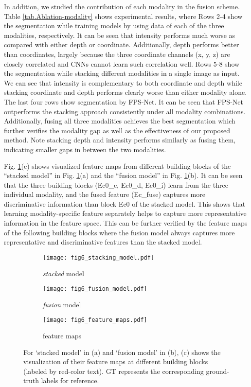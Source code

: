 \documentclass[preprint,review,3p]{elsarticle}
\begin{document}
In addition, we studied the contribution of each modality in the fusion scheme. Table \ref{tab.Ablation-modality} shows experimental results, where Rows 2-4 show the segmentation while training models by using data of each of the three modalities, respectively. It can be seen that intensity performs much worse as compared with either depth or coordinate.
Additionally, depth performs better than coordinates, largely because the three coordinate channels (x, y, z) are closely correlated and CNNs cannot learn such correlation well. 
Rows 5-8 show the segmentation while stacking different modalities in a single image as input. 
We can see that intensity is complementary to both coordinate and depth while stacking coordinate and depth performs clearly worse than either modality alone. 
The last four rows show segmentation by FPS-Net. It can be seen that FPS-Net outperforms the stacking approach consistently under all modality combinations.
Additionally, fusing all three modalities achieves the best segmentation which further verifies the modality gap as well as the effectiveness of our proposed method.
Note stacking depth and intensity performs similarly as fusing them, indicating smaller gaps in between the two modalities.


Fig. \ref{fig.features}(c) shows visualized feature maps from different building blocks of the ``stacked model” in Fig. \ref{fig.features}(a) and the ``fusion model” in Fig. \ref{fig.features}(b). It can be seen that the three building blocks (Ec0\_c, Ec0\_d, Ec0\_i) learn from the three individual modality, and the fused feature (Ec\_fuse) captures more discriminative information than block Ec0 of the stacked model. This shows that learning modality-specific feature separately helps to capture more representative information in the feature space. This can be further verified by the feature maps of the following building blocks where the fusion model always captures more representative and discriminative features than the stacked model.

\begin{figure}
  \begin{subfigure}[b]{0.45\textwidth}
  \texttt{[image: fig6\_stacking\_model.pdf]}
  \caption{\textit{stacked} model}
  \end{subfigure}
  \begin{subfigure}[b]{0.45\textwidth}
  \texttt{[image: fig6\_fusion\_model.pdf]}
  \caption{\textit{fusion} model}
  \end{subfigure}
  
  \begin{subfigure}[b]{\textwidth}
  \texttt{[image: fig6\_feature\_maps.pdf]}
  \caption{feature maps}
  \end{subfigure}
  \caption{
 For `stacked model' in (a) and `fusion model' in (b), (c) shows the visualization of their feature maps at different building blocks (labeled by red-color text). GT represents the corresponding ground-truth labels for reference.}\label{fig.features}
\end{figure}
\end{document}
